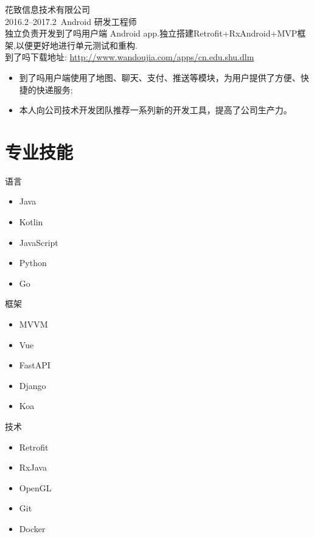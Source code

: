 \documentclass[11pt]{res}
\begin{document}
\begin{resume}
\large 花致信息技术有限公司\normalsize\\
  \small 2016.2--2017.2\ Android 研发工程师\\独立负责开发到了吗用户端 Android app.独立搭建Retrofit+RxAndroid+MVP框架,以便更好地进行单元测试和重构.\\到了吗下载地址: \url{http://www.wandoujia.com/apps/cn.edu.shu.dlm} \normalsize
  \begin{itemize}
    \item 到了吗用户端使用了地图、聊天、支付、推送等模块，为用户提供了方便、快捷的快递服务;
    \item 本人向公司技术开发团队推荐一系列新的开发工具，提高了公司生产力。
  \end{itemize}
\section{专业技能}
  \begin{multicols}{3}
    语言
    \begin{itemize}
      \item Java
      \item Kotlin
      \item JavaScript
      \item Python
      \item Go
    \end{itemize}
    框架
    \begin{itemize}
      \item MVVM
      \item Vue
      \item FastAPI
      \item Django
      \item Koa
    \end{itemize}
    技术
    \begin{itemize}
      \item Retrofit
      \item RxJava
      \item OpenGL
      \item Git
      \item Docker
    \end{itemize}
  \end{multicols}


\end{resume}
\end{document}
